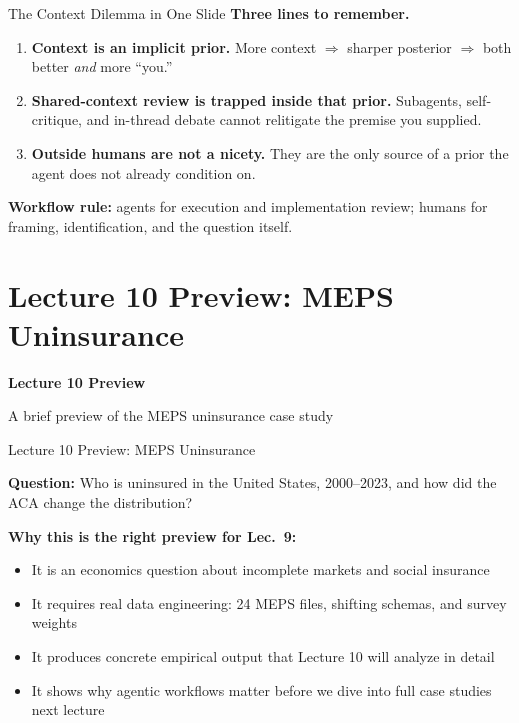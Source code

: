 \documentclass[10pt,english,aspectratio=169]{beamer}
\newcommand{\sectiondivider}[2]{%
\begin{frame}[plain,noframenumbering]
\begin{center}
\vfill
{\Large\textbf{#1}\par}
\vspace{0.35cm}
{\normalsize #2\par}
\vfill
\end{center}
\end{frame}
}
\begin{document}
\begin{frame}{The Context Dilemma in One Slide}
\textbf{Three lines to remember.}

\vspace{0.3cm}

\begin{enumerate}
    \item \textbf{Context is an implicit prior.} More context $\Rightarrow$ sharper posterior $\Rightarrow$ both better \textit{and} more ``you.''
    \item \textbf{Shared-context review is trapped inside that prior.} Subagents, self-critique, and in-thread debate cannot relitigate the premise you supplied.
    \item \textbf{Outside humans are not a nicety.} They are the only source of a prior the agent does not already condition on.
\end{enumerate}

\vspace{0.3cm}

\textbf{Workflow rule:} agents for execution and implementation review; humans for framing, identification, and the question itself.
\end{frame}

\section{Lecture 10 Preview: MEPS Uninsurance}

\sectiondivider{Lecture 10 Preview}{A brief preview of the MEPS uninsurance case study}

\begin{frame}{Lecture 10 Preview: MEPS Uninsurance}
\begin{tcolorbox}[colback=blue!3, colframe=RedTitle!60]
\textbf{Question:} Who is uninsured in the United States, 2000--2023, and how did the ACA change the distribution?
\end{tcolorbox}

\vspace{0.25cm}

\textbf{Why this is the right preview for Lec.~9:}
\begin{itemize}
    \item It is an economics question about incomplete markets and social insurance
    \item It requires real data engineering: 24 MEPS files, shifting schemas, and survey weights
    \item It produces concrete empirical output that Lecture 10 will analyze in detail
    \item It shows why agentic workflows matter before we dive into full case studies next lecture
\end{itemize}
\end{frame}
\end{document}
